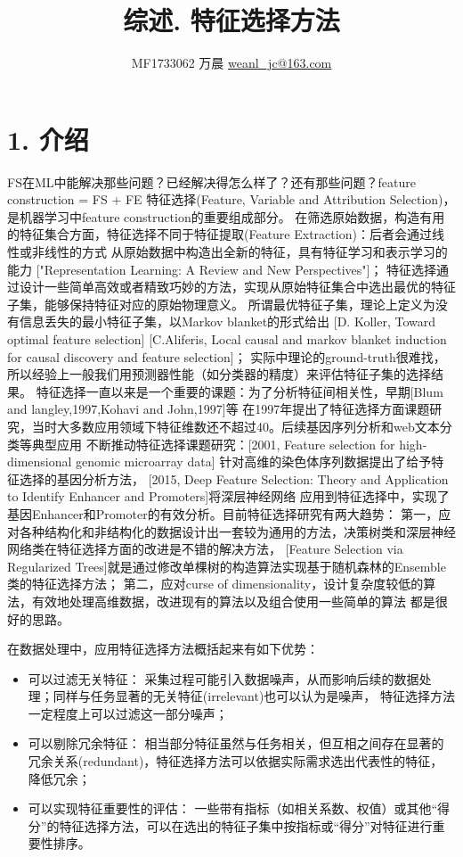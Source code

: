 \documentclass[a4paper,UTF8]{article}
\begin{document}
\title{综述. 特征选择方法}
\author{MF1733062 万晨 \url{weanl_jc@163.com}}
\maketitle

\section*{1. 介绍}
  FS在ML中能解决那些问题？已经解决得怎么样了？还有那些问题？feature construction = FS + FE
  特征选择(Feature, Variable and Attribution Selection)，是机器学习中feature construction的重要组成部分。
  在筛选原始数据，构造有用的特征集合方面，特征选择不同于特征提取(Feature Extraction)：后者会通过线性或非线性的方式
  从原始数据中构造出全新的特征，具有特征学习和表示学习的能力
  ["Representation Learning: A Review and New Perspectives"]；
  特征选择通过设计一些简单高效或者精致巧妙的方法，实现从原始特征集合中选出最优的特征子集，能够保持特征对应的原始物理意义。
  所谓最优特征子集，理论上定义为没有信息丢失的最小特征子集，以Markov blanket的形式给出
  [D. Koller, Toward optimal feature selection]
  [C.Aliferis, Local causal and markov blanket induction for causal discovery and feature selection]；
  实际中理论的ground-truth很难找，所以经验上一般我们用预测器性能（如分类器的精度）来评估特征子集的选择结果。
  特征选择一直以来是一个重要的课题：为了分析特征间相关性，早期[Blum and langley,1997,Kohavi and John,1997]等
  在1997年提出了特征选择方面课题研究，当时大多数应用领域下特征维数还不超过40。后续基因序列分析和web文本分类等典型应用
  不断推动特征选择课题研究：[2001, Feature selection for high-dimensional genomic microarray data]
  针对高维的染色体序列数据提出了给予特征选择的基因分析方法，
  [2015, Deep Feature Selection: Theory and Application to Identify Enhancer and Promoters]将深层神经网络
  应用到特征选择中，实现了基因Enhancer和Promoter的有效分析。目前特征选择研究有两大趋势：
  第一，应对各种结构化和非结构化的数据设计出一套较为通用的方法，决策树类和深层神经网络类在特征选择方面的改进是不错的解决方法，
  [Feature Selection via Regularized Trees]就是通过修改单棵树的构造算法实现基于随机森林的Ensemble类的特征选择方法；
  第二，应对curse of dimensionality，设计复杂度较低的算法，有效地处理高维数据，改进现有的算法以及组合使用一些简单的算法
  都是很好的思路。

  在数据处理中，应用特征选择方法概括起来有如下优势：
  \begin{itemize}
    \item 可以过滤无关特征：
    采集过程可能引入数据噪声，从而影响后续的数据处理；同样与任务显著的无关特征(irrelevant)也可以认为是噪声，
    特征选择方法一定程度上可以过滤这一部分噪声；

    \item 可以剔除冗余特征：
    相当部分特征虽然与任务相关，但互相之间存在显著的冗余关系(redundant)，特征选择方法可以依据实际需求选出代表性的特征，
    降低冗余；

    \item 可以实现特征重要性的评估：
    一些带有指标（如相关系数、权值）或其他“得分”的特征选择方法，可以在选出的特征子集中按指标或“得分”对特征进行重要性排序。

  \end{itemize}
\end{document}
